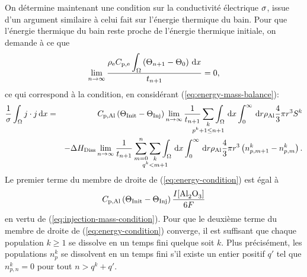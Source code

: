 On détermine maintenant une condition sur la conductivité électrique
$\sigma$, issue d'un argument similaire à celui fait sur
l'énergie thermique du bain. Pour que l'énergie thermique du bain
reste proche de l'énergie thermique initiale, on demande à ce que
\begin{equation}
  \lim_{n\to\infty}\frac{\rho_\mathrm{e}C_{\mathrm{p,e}}\displaystyle\int_\Omega\left( \Theta_{n+1}
    - \Theta_0 \right)\,\mathrm dx}{t_{n+1}} = 0,
\end{equation}
ce qui correspond à la condition, en considérant (\ref{eq:energy-mass-balance}):
\begin{eqnarray}
  \frac{1}{\conductivity} \int_\Omega j\cdot j\intd{x} &=&
  \aluminahc\parent{\tinit - \tinj}\lim_{n\to\infty}\frac{1}{t_{n+1}}\sum_{\mathclap{\substack{k\\ p^k +
  1 \leq n + 1}}}\int_\Omega\intd{x}\int_0^\infty\intd{r}\aluminadensity
  \frac{4}{3}\pi r^3 S^k\nonumber \\
  &&-
       {\aluminadissolutionenthalpy}\lim_{n\to\infty}\frac{1}{t_{n+1}}\sum_{m = 0}^{n}\sum_{\mathclap{\substack{k\\ q^k < m + 1}}} \int_\Omega\intd{x}\int_0^\infty\intd{r} \aluminadensity \frac{4}{3}\pi r^3\parent{n_{p,m+1}^k-n_{p,m}^k}.\nonumber\\
       \label{eq:energy-condition}
\end{eqnarray}
Le premier terme du membre de droite de (\ref{eq:energy-condition})
est égal à
\begin{equation*}
  \aluminahc\parent{\tinit-\tinj}  \frac{I[\cee{Al2O3}]}{6F}
\end{equation*}
en vertu de (\ref{eq:injection-mass-condition}). Pour que le deuxième
terme du membre de droite de (\ref{eq:energy-condition}) converge, il
est suffisant que chaque population $k\geq 1$ se dissolve en un temps
fini quelque soit $k$. Plus précisément, les populations $n_p^k$
se dissolvent en un temps fini s'il existe un entier positif $q'$ tel
que $n_{p,n}^k = 0$ pour tout $n > q^k + q'$.

